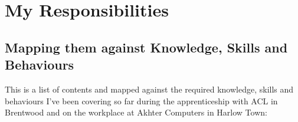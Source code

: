 \documentclass[a4paper,12pt]{book}
\begin{document}
\chapter{My Responsibilities}








\bigskip
\bigskip
\bigskip
\bigskip

\section{Mapping them against Knowledge, Skills and Behaviours}
\noindent This is a list of contents and mapped against the required knowledge, skills and behaviours I've been covering so far during the apprenticeship with ACL in Brentwood and on the workplace at Akhter Computers in Harlow Town:
%
%

\medskip
\end{document}
